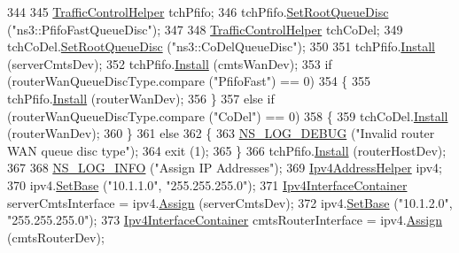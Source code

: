 \begin{DoxyCode}
344 
345   \hyperlink{classns3_1_1TrafficControlHelper}{TrafficControlHelper} tchPfifo;
346   tchPfifo.\hyperlink{classns3_1_1TrafficControlHelper_a8588aac7a08e4dc4e7bb10fa7b9e25c8}{SetRootQueueDisc} (\textcolor{stringliteral}{"ns3::PfifoFastQueueDisc"});
347 
348   \hyperlink{classns3_1_1TrafficControlHelper}{TrafficControlHelper} tchCoDel;
349   tchCoDel.\hyperlink{classns3_1_1TrafficControlHelper_a8588aac7a08e4dc4e7bb10fa7b9e25c8}{SetRootQueueDisc} (\textcolor{stringliteral}{"ns3::CoDelQueueDisc"});
350 
351   tchPfifo.\hyperlink{classns3_1_1TrafficControlHelper_a0aa6a8e2fbb1c196589e16f48c99f0b9}{Install} (serverCmtsDev);
352   tchPfifo.\hyperlink{classns3_1_1TrafficControlHelper_a0aa6a8e2fbb1c196589e16f48c99f0b9}{Install} (cmtsWanDev);
353   \textcolor{keywordflow}{if} (routerWanQueueDiscType.compare (\textcolor{stringliteral}{"PfifoFast"}) == 0)
354     \{
355       tchPfifo.\hyperlink{classns3_1_1TrafficControlHelper_a0aa6a8e2fbb1c196589e16f48c99f0b9}{Install} (routerWanDev);
356     \}
357   \textcolor{keywordflow}{else} \textcolor{keywordflow}{if} (routerWanQueueDiscType.compare (\textcolor{stringliteral}{"CoDel"}) == 0)
358     \{
359       tchCoDel.\hyperlink{classns3_1_1TrafficControlHelper_a0aa6a8e2fbb1c196589e16f48c99f0b9}{Install} (routerWanDev);
360     \}
361   \textcolor{keywordflow}{else}
362     \{
363       \hyperlink{group__logging_ga413f1886406d49f59a6a0a89b77b4d0a}{NS\_LOG\_DEBUG} (\textcolor{stringliteral}{"Invalid router WAN queue disc type"});
364       exit (1);
365     \}  
366   tchPfifo.\hyperlink{classns3_1_1TrafficControlHelper_a0aa6a8e2fbb1c196589e16f48c99f0b9}{Install} (routerHostDev);
367 
368   \hyperlink{group__logging_gafbd73ee2cf9f26b319f49086d8e860fb}{NS\_LOG\_INFO} (\textcolor{stringliteral}{"Assign IP Addresses"});
369   \hyperlink{classns3_1_1Ipv4AddressHelper}{Ipv4AddressHelper} ipv4;
370   ipv4.\hyperlink{classns3_1_1Ipv4AddressHelper_acf7b16dd25bac67e00f5e25f90a9a035}{SetBase} (\textcolor{stringliteral}{"10.1.1.0"}, \textcolor{stringliteral}{"255.255.255.0"});
371   \hyperlink{classns3_1_1Ipv4InterfaceContainer}{Ipv4InterfaceContainer} serverCmtsInterface = ipv4.\hyperlink{classns3_1_1Ipv4AddressHelper_af8e7f4a1a7e74c00014a1eac445a27af}{Assign} (serverCmtsDev);
372   ipv4.\hyperlink{classns3_1_1Ipv4AddressHelper_acf7b16dd25bac67e00f5e25f90a9a035}{SetBase} (\textcolor{stringliteral}{"10.1.2.0"}, \textcolor{stringliteral}{"255.255.255.0"});
373   \hyperlink{classns3_1_1Ipv4InterfaceContainer}{Ipv4InterfaceContainer} cmtsRouterInterface = ipv4.\hyperlink{classns3_1_1Ipv4AddressHelper_af8e7f4a1a7e74c00014a1eac445a27af}{Assign} (cmtsRouterDev);

\end{DoxyCode}
